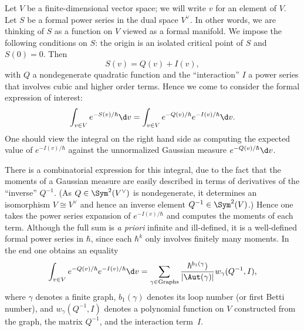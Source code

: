 \documentclass[10pt]{amsart}
\begin{document}
Let $V$ be a finite-dimensional vector space;
we will write $v$ for an element of $V$.
Let $S$ be a formal power series in the dual space $V^\vee$.
In other words, we are thinking of $S$ as a function on $V$ viewed as a formal manifold.
We impose the following conditions on $S$:
the origin is an isolated critical point of $S$ and $S(0) = 0$.
Then
\[
S(v) = Q(v) + I(v),
\]
with $Q$ a nondegenerate quadratic function 
and the ``interaction'' $I$ a power series that involves cubic and higher order terms.
Hence we come to consider the formal expression of interest:
\[
\int_{v \in V} e^{-S(v)/\hbar} \d v = \int_{v \in V} e^{-Q(v)/\hbar} e^{-I(v)/\hbar} \d v.
\]
One should view the integral on the right hand side as computing the expected value of $e^{-I(v)/\hbar}$ against the unnormalized Gaussian measure $e^{-Q(v)/\hbar}\d v$.

There is a combinatorial expression for this integral,
due to the fact that the moments of a Gaussian measure are easily described in terms of derivatives of the ``inverse'' $Q^{-1}$.
(As $Q \in \Sym^2(V^\vee)$ is nondegenerate, 
it determines an isomorphism $V \cong V^\vee$ and hence an inverse element $Q^{-1} \in \Sym^2(V)$.)
Hence one takes the power series expansion of $e^{-I(v)/\hbar}$
and computes the moments of each term.
Although the full sum is {\em a priori} infinite and ill-defined,
it is a well-defined formal power series in $\hbar$,
since each $\hbar^k$ only involves finitely many moments.
In the end one obtains an equality
\[
\int_{v \in V} e^{-Q(v)/\hbar} e^{-I(v)/\hbar} \d v = \sum_{\gamma \in {\rm Graphs}} \frac{\hbar^{b_1(\gamma})}{|\Aut(\gamma)|} w_\gamma(Q^{-1}, I),
\]
where $\gamma$ denotes a finite graph,
$b_1(\gamma)$ denotes its loop number (or first Betti number),
and $w_\gamma(Q^{-1},I)$ denotes a polynomial function on $V$ constructed from the graph, the matrix $Q^{-1}$, and the interaction term~$I$.
\end{document}

